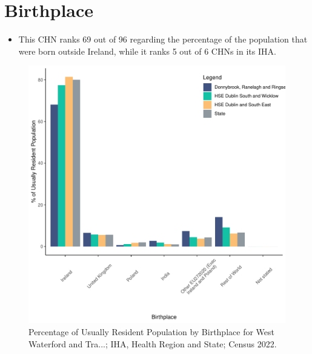 \documentclass{article}
\begin{document}
\section{Birthplace}\label{sect:Birth}
\begin{itemize}
\item This CHN ranks  69 out of 96 regarding the percentage of the population that were born outside Ireland, while it ranks  5 out of 6 CHNs in its IHA.
\end{itemize}
\begin{figure}[H]
	\centering
	\includegraphics[width = 130mm]{../figures/BirthED.pdf}
	\caption{Percentage of Usually Resident Population by Birthplace for West Waterford and Tra...; IHA, Health Region and State; Census 2022.}
	\label{fig:vbnv}
	\end{figure}
	
\end{document}
